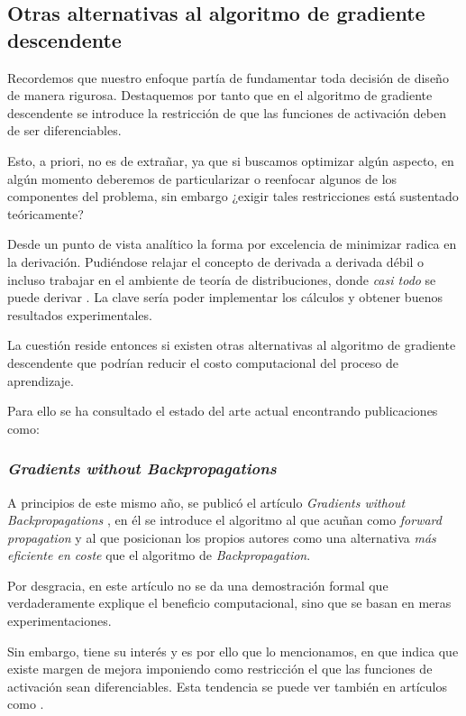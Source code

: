 
\subsection{Otras alternativas al algoritmo de gradiente descendente}  
\label{ch05:alternativas-gradiente-descendente}
Recordemos que nuestro enfoque partía de
fundamentar toda decisión de diseño de manera rigurosa. Destaquemos por tanto que en el algoritmo de gradiente descendente se introduce la restricción de que 
las funciones de activación deben de ser diferenciables.

Esto, a priori, no es de extrañar, ya que si buscamos optimizar algún aspecto, en algún momento deberemos de particularizar o reenfocar algunos de los componentes del problema, sin embargo ¿exigir tales restricciones está sustentado teóricamente? 

Desde un punto de vista analítico la forma por excelencia de minimizar radica en la derivación. Pudiéndose relajar el concepto de derivada a derivada 
débil o incluso trabajar en el ambiente de teoría de distribuciones, donde \textit{casi todo} se puede 
derivar \cite{teoriaDistribuciones}.
 La clave sería poder implementar los cálculos y obtener buenos resultados experimentales.

La cuestión reside entonces si existen otras alternativas al algoritmo de gradiente descendente 
que podrían reducir el costo computacional del proceso de aprendizaje. 

Para ello se ha consultado el estado del arte actual encontrando publicaciones como: 

\subsubsection{\textit{Gradients without Backpropagations}}

A principios de este mismo año, se publicó el artículo \textit{Gradients without Backpropagations} \cite{forwardGradient}, en él se introduce el algoritmo al que acuñan como 
\textit{forward propagation} y al que posicionan los propios autores como una alternativa \textit{más eficiente en coste} que el algoritmo de \textit{Backpropagation}. 

Por desgracia, en este artículo no se da una demostración formal que verdaderamente explique el beneficio computacional, sino que se basan en meras experimentaciones. 

Sin embargo, tiene su interés y es por ello que lo mencionamos, en que indica que existe margen de mejora 
imponiendo como restricción el que las funciones de activación sean diferenciables. 
Esta tendencia se puede ver también en artículos como \cite{TransactionsOnNeuralNetworks}.



